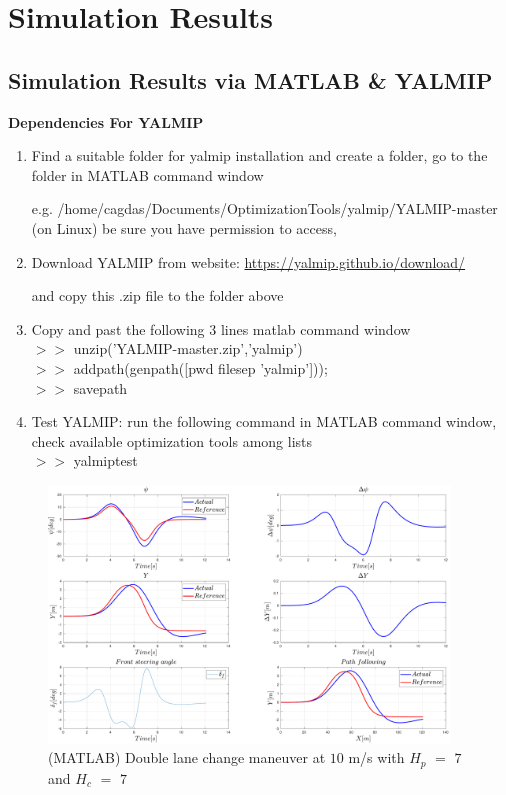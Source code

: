\documentclass[12pt]{article}
\begin{document}
\section{Simulation Results}
\subsection{Simulation Results via MATLAB \& YALMIP}
\textbf{Dependencies For YALMIP}
\begin{enumerate}
	\item Find a suitable folder for yalmip installation and create a folder, go to the folder in MATLAB command window

	e.g. /home/cagdas/Documents/OptimizationTools/yalmip/YALMIP-master (on Linux) be sure you have permission to access,
	\item Download YALMIP from website:
\url{https://yalmip.github.io/download/}

	and copy this .zip file to the folder above
	\item Copy and past the following 3 lines matlab command window
	\\ $>>$ unzip('YALMIP-master.zip','yalmip')
	\\ $>>$ addpath(genpath([pwd filesep 'yalmip']));
	\\ $>>$ savepath
	\item Test YALMIP: run the following command in MATLAB command window, check available optimization tools among lists
	\\ $>>$ yalmiptest
\end{enumerate}

\begin{figure}[!ht]
	\centering
	\includegraphics[width=0.95\textwidth,keepaspectratio]{images/Double_Lane_Change_Maneuver_MATLAB_01.pdf}
	\caption{(MATLAB) Double lane change maneuver at $10$ m/s with $H_p$ $=$ $7$ and $H_c$ $=$ $7$}
	\label{fig_08:double_lane_change_maneuver_01}
\end{figure}
\end{document}
